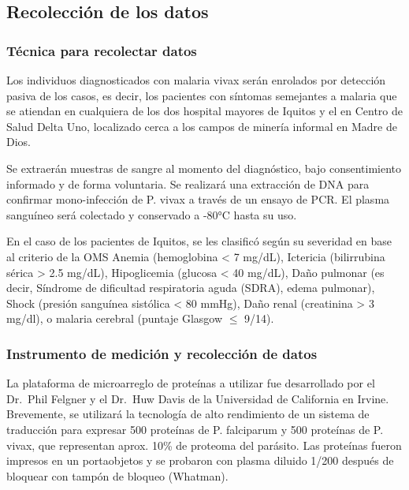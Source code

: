 \documentclass[]{article}
\begin{document}
\subsection{Recolección de los datos}\label{recoleccion-de-los-datos}

\subsubsection{Técnica para recolectar
datos}\label{tecnica-para-recolectar-datos}

Los individuos diagnosticados con malaria vivax serán enrolados por
detección pasiva de los casos, es decir, los pacientes con síntomas
semejantes a malaria que se atiendan en cualquiera de los dos hospital
mayores de Iquitos y el en Centro de Salud Delta Uno, localizado cerca a
los campos de minería informal en Madre de Dios.

Se extraerán muestras de sangre al momento del diagnóstico, bajo
consentimiento informado y de forma voluntaria. Se realizará una
extracción de DNA para confirmar mono-infección de P. vivax a través de
un ensayo de PCR. El plasma sanguíneo será colectado y conservado a
-80°C hasta su uso.

En el caso de los pacientes de Iquitos, se les clasificó según su
severidad en base al criterio de la OMS Anemia (hemoglobina \textless{}
7 mg/dL), Ictericia (bilirrubina sérica \textgreater{} 2.5 mg/dL),
Hipoglicemia (glucosa \textless{} 40 mg/dL), Daño pulmonar (es decir,
Síndrome de dificultad respiratoria aguda (SDRA), edema pulmonar), Shock
(presión sanguínea sistólica \textless{} 80 mmHg), Daño renal
(creatinina \textgreater{} 3 mg/dl), o malaria cerebral (puntaje Glasgow
\(\le\) 9/14).

\subsubsection{Instrumento de medición y recolección de
datos}\label{instrumento-de-medicion-y-recoleccion-de-datos}

La plataforma de microarreglo de proteínas a utilizar fue desarrollado
por el Dr.~Phil Felgner y el Dr.~Huw Davis de la Universidad de
California en Irvine. Brevemente, se utilizará la tecnología de alto
rendimiento de un sistema de traducción para expresar 500 proteínas de
P. falciparum y 500 proteínas de P. vivax, que representan aprox. 10\%
de proteoma del parásito. Las proteínas fueron impresos en un
portaobjetos y se probaron con plasma diluido 1/200 después de bloquear
con tampón de bloqueo (Whatman).
\end{document}
